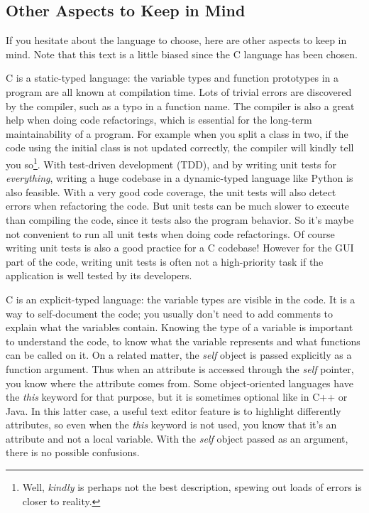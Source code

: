 \subsection{Other Aspects to Keep in Mind}
If you hesitate about the language to choose, here are other aspects to keep in mind. Note that this text is a little biased since the C language has been chosen.

C is a static-typed language: the variable types and function prototypes in a program are all known at compilation time. Lots of trivial errors are discovered by the compiler, such as a typo in a function name. The compiler is also a great help when doing code refactorings, which is essential for the long-term maintainability of a program. For example when you split a class in two, if the code using the initial class is not updated correctly, the compiler will kindly tell you so\footnote{Well, \emph{kindly} is perhaps not the best description, spewing out loads of errors is closer to reality.}. With test-driven development (TDD), and by writing unit tests for \emph{everything}, writing a huge codebase in a dynamic-typed language like Python is also feasible. With a very good code coverage, the unit tests will also detect errors when refactoring the code. But unit tests can be much slower to execute than compiling the code, since it tests also the program behavior. So it's maybe not convenient to run all unit tests when doing code refactorings. Of course writing unit tests is also a good practice for a C codebase! However for the GUI part of the code, writing unit tests is often not a high-priority task if the application is well tested by its developers.

C is an explicit-typed language: the variable types are visible in the code. It is a way to self-document the code; you usually don't need to add comments to explain what the variables contain. Knowing the type of a variable is important to understand the code, to know what the variable represents and what functions can be called on it. On a related matter, the \emph{self} object is passed explicitly as a function argument. Thus when an attribute is accessed through the \emph{self} pointer, you know where the attribute comes from. Some object-oriented languages have the \emph{this} keyword for that purpose, but it is sometimes optional like in C++ or Java. In this latter case, a useful text editor feature is to highlight differently attributes, so even when the \emph{this} keyword is not used, you know that it's an attribute and not a local variable. With the \emph{self} object passed as an argument, there is no possible confusions.

